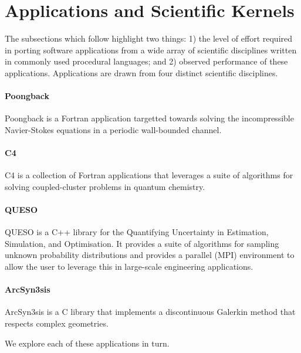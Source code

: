 \section{Applications and Scientific Kernels}
\label{sec:apps}

The subsections which follow highlight two things: 1) the level of effort
required in porting software applications from a wide array of scientific
disciplines written in commonly used procedural languages; and 2) observed
performance of these applications.  Applications are drawn from four distinct
scientific disciplines.

\paragraph{Poongback}  Poongback is a Fortran application targetted towards
solving the incompressible Navier-Stokes equations in a periodic wall-bounded
channel.

\paragraph{C4}  C4 is a collection of Fortran applications that leverages a
suite of algorithms for solving coupled-cluster problems in quantum chemistry.

\paragraph{QUESO}  QUESO is a C++ library for the Quantifying Uncertainty in
Estimation, Simulation, and Optimisation.  It provides a suite of algorithms
for sampling unknown probability distributions and provides a parallel (MPI)
environment to allow the user to leverage this in large-scale engineering
applications.

\paragraph{ArcSyn3sis}  ArcSyn3sis is a C library that implements a
discontinuous Galerkin method that respects complex geometries.

We explore each of these applications in turn.
